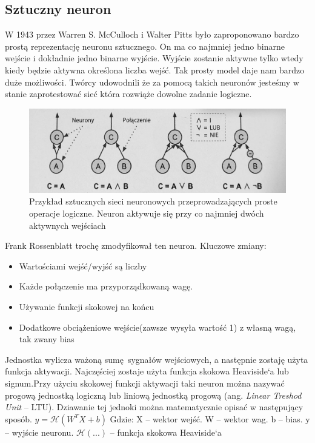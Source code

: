\documentclass{article}
\begin{document}
\subsection{Sztuczny neuron}
W 1943 przez Warren S. McCulloch i Walter Pitts było zaproponowano bardzo prostą reprezentację neuronu sztucznego. On ma co najmniej jedno binarne wejście i dokładnie jedno binarne wyjście. Wyjście zostanie aktywne tylko wtedy kiedy będzie aktywna określona liczba wejść. \cite{mcculloch1943logical} Tak prosty model daje nam bardzo duże możliwości. Twórcy udowodnili że za pomocą takich neuronów jesteśmy w stanie zaprotestować sieć która rozwiąże dowolne zadanie logiczne.

\clearpage
	
\begin{figure}
	\centering
	\includegraphics[width=\textwidth,keepaspectratio=true]{SSN_simple_neurons}
	\caption{
		Przykład sztucznych sieci neuronowych przeprowadzających proste operacje logiczne. Neuron aktywuje się przy co najmniej dwóch aktywnych wejściach \cite{geron}
	}
\end{figure}

Frank Rossenblatt trochę zmodyfikował ten neuron.\newline
Kluczowe zmiany:
\begin{itemize}
	\item Wartościami wejść/wyjść są liczby
	\item Każde połączenie ma przyporządkowaną wagę.
	\item Używanie funkcji skokowej na końcu
	\item Dodatkowe obciążeniowe wejście(zawsze wysyła wartość 1) z własną wagą, tak zwany bias
\end{itemize}
Jednostka wylicza ważoną sumę sygnałów wejściowych, a następnie zostaję użyta funkcja aktywacji. Najczęściej zostaje użyta funkcja skokowa Heaviside`a lub signum.Przy użyciu skokowej funkcji aktywacji taki neuron można nazywać progową jednostką logiczną lub liniową jednostką progową (ang. \textit{Linear Treshod Unit} -- LTU). Dziawanie tej jednoki można matematycznie opisać w następujący sposób.\newline\newline
$ y = \mathcal{H}(W^{T}X + b) $\newline \newline
Gdzie: \newline
X -- wektor wejść. \newline
W -- wektor wag. \newline
b -- bias. \newline
y -- wyjście neuronu. \newline
$ \mathcal{H}(...) $ -- funkcja skokowa Heaviside`a\newline
\end{document}
